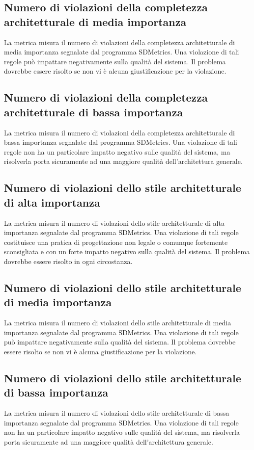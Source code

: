 \subsection{Numero di violazioni della completezza architetturale di media importanza}
La metrica misura il numero di violazioni della completezza architetturale di media importanza segnalate dal programma SDMetrics. Una violazione di tali regole può impattare negativamente sulla qualità del sistema. Il problema dovrebbe essere risolto se non vi è alcuna giustificazione per la violazione.



\subsection{Numero di violazioni della completezza architetturale di bassa importanza}
La metrica misura il numero di violazioni della completezza architetturale di bassa importanza segnalate dal programma SDMetrics. Una violazione di tali regole non ha un particolare impatto negativo sulle qualità del sistema, ma risolverla porta sicuramente ad una maggiore qualità dell'architettura generale.



\subsection{Numero di violazioni dello stile architetturale di alta importanza}
La metrica misura il numero di violazioni dello stile architetturale di alta importanza segnalate dal programma SDMetrics. Una violazione di tali regole costituisce una pratica di progettazione non legale o comunque fortemente sconsigliata e con un forte impatto negativo sulla qualità del sistema. Il problema dovrebbe essere risolto in ogni circostanza.



\subsection{Numero di violazioni dello stile architetturale di media importanza}
La metrica misura il numero di violazioni dello stile architetturale di media importanza segnalate dal programma SDMetrics. Una violazione di tali regole può impattare negativamente sulla qualità del sistema. Il problema dovrebbe essere risolto se non vi è alcuna giustificazione per la violazione.



\subsection{Numero di violazioni dello stile architetturale di bassa importanza}
La metrica misura il numero di violazioni dello stile architetturale di bassa importanza segnalate dal programma SDMetrics. Una violazione di tali regole non ha un particolare impatto negativo sulle qualità del sistema, ma risolverla porta sicuramente ad una maggiore qualità dell'architettura generale.



